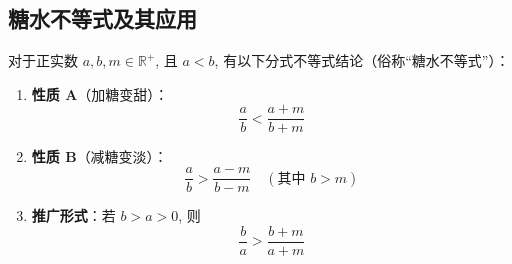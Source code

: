 \subsection{糖水不等式及其应用}

\Conclusion

对于正实数 \(a, b, m \in \mathbb{R}^+\), 且 \(a < b\), 有以下分式不等式结论（俗称“糖水不等式”）：

\begin{enumerate}
    \item \textbf{性质 A}（加糖变甜）：
    \[ \frac{a}{b} < \frac{a+m}{b+m} \]

    \item \textbf{性质 B}（减糖变淡）：
    \[ \frac{a}{b} > \frac{a-m}{b-m} \quad (\text{其中 } b > m) \]

    \item \textbf{推广形式}：若 \(b > a > 0\), 则
    \[ \frac{b}{a} > \frac{b+m}{a+m} \]
\end{enumerate}